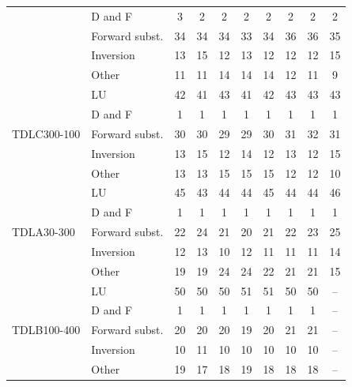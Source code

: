 \begin{table}[htbp]
\begin{tabular}{llcccccccc}
 & D and F & 3 & 2 & 2 & 2 & 2 & 2 & 2 & 2 \\
 & Forward subst. & 34 & 34 & 34 & 33 & 34 & 36 & 36 & 35 \\
 & Inversion & 13 & 15 & 12 & 13 & 12 & 12 & 12 & 15 \\
 & Other & 11 & 11 & 14 & 14 & 14 & 12 & 11 & 9 \\
\midrule
\multirow{5}{*}{TDLC300-100} & LU & 42 & 41 & 43 & 41 & 42 & 43 & 43 & 43 \\
 & D and F & 1 & 1 & 1 & 1 & 1 & 1 & 1 & 1 \\
 & Forward subst. & 30 & 30 & 29 & 29 & 30 & 31 & 32 & 31 \\
 & Inversion & 13 & 15 & 12 & 14 & 12 & 13 & 12 & 15 \\
 & Other & 13 & 13 & 15 & 15 & 15 & 12 & 12 & 10 \\
\midrule
\multirow{5}{*}{TDLA30-300} & LU & 45 & 43 & 44 & 44 & 45 & 44 & 44 & 46 \\
 & D and F & 1 & 1 & 1 & 1 & 1 & 1 & 1 & 1 \\
 & Forward subst. & 22 & 24 & 21 & 20 & 21 & 22 & 23 & 25 \\
 & Inversion & 12 & 13 & 10 & 12 & 11 & 11 & 11 & 14 \\
 & Other & 19 & 19 & 24 & 24 & 22 & 21 & 21 & 15 \\
\midrule
\multirow{5}{*}{TDLB100-400} & LU & 50 & 50 & 50 & 51 & 51 & 50 & 50 & -- \\
 & D and F & 1 & 1 & 1 & 1 & 1 & 1 & 1 & -- \\
 & Forward subst. & 20 & 20 & 20 & 19 & 20 & 21 & 21 & -- \\
 & Inversion & 10 & 11 & 10 & 10 & 10 & 10 & 10 & -- \\
 & Other & 19 & 17 & 18 & 19 & 18 & 18 & 18 & -- \\
\bottomrule
\end{tabular}
\vspace{4pt}
\end{table}

